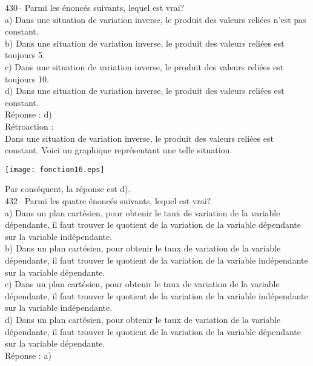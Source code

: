 ﻿\documentclass[letterpaper, 12pt]{article}
\begin{document}
430-- Parmi les \'enonc\'es suivants, lequel est vrai?\\
a) Dans une situation de variation inverse, le produit des valeurs reli\'ees
n'est pas constant.\\
b) Dans une situation de variation inverse, le produit des valeurs reli\'ees
est toujours 5.\\
c) Dans une situation de variation inverse, le produit des valeurs reli\'ees
est toujours 10.\\
d) Dans une situation de variation inverse, le produit des valeurs reli\'ees
est constant.\\

R\'eponse :  d)\\

R\'etroaction : \\
Dans une situation de variation inverse, le produit des valeurs reli\'ees
est constant.  Voici un graphique repr\'esentant une telle situation.\\
    \begin{center}
    \texttt{[image: fonction16.eps]}
    \end{center}

Par cons\'equent, la r\'eponse est d).\\




432-- Parmi les quatre \'enonc\'es suivants, lequel est vrai?\\
a) Dans un plan cart\'esien, pour obtenir le taux de variation de la
variable d\'ependante, il faut trouver le quotient de la variation de la
variable d\'ependante sur la variable ind\'ependante.\\
b) Dans un plan cart\'esien, pour obtenir le taux de variation de la
variable d\'ependante, il faut trouver le quotient de la variation de la
variable ind\'ependante sur la variable d\'ependante.\\
c) Dans un plan cart\'esien, pour obtenir le taux de variation de la
variable d\'ependante, il faut trouver le quotient de la variation de la
variable ind\'ependante sur la variable ind\'ependante.\\
d) Dans un plan cart\'esien, pour obtenir le taux de variation de la
variable d\'ependante, il faut trouver le quotient de la variation de la
variable d\'ependante sur la variable d\'ependante.\\

R\'eponse :  a)\\
\end{document}
